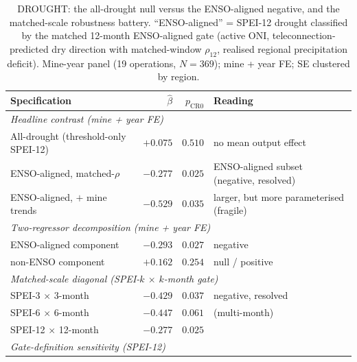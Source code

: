 \begin{table}[H]
\centering
\caption{DROUGHT: the all-drought null versus the ENSO-aligned negative, and the matched-scale robustness battery. ``ENSO-aligned'' = SPEI-12 drought classified by the matched 12-month ENSO-aligned gate (active ONI, teleconnection-predicted dry direction with matched-window $\rho_{12}$, realised regional precipitation deficit). Mine-year panel (19 operations, $N=369$); mine + year FE; SE clustered by region.}
\label{tab:drought-matched}
\small
\begin{tabular}{lrrl}
\toprule
\textbf{Specification} & $\hat\beta$ & $p_{\text{CR0}}$ & \textbf{Reading} \\
\midrule
\multicolumn{4}{l}{\emph{Headline contrast (mine + year FE)}} \\
\quad All-drought (threshold-only SPEI-12)      & $+0.075$ & $0.510$ & no mean output effect \\
\quad ENSO-aligned, matched-$\rho$              & $-0.277$ & $0.025$ & ENSO-aligned subset (negative, resolved) \\
\quad ENSO-aligned, $+$ mine trends             & $-0.529$ & $0.035$ & larger, but more parameterised (fragile) \\
\midrule
\multicolumn{4}{l}{\emph{Two-regressor decomposition (mine + year FE)}} \\
\quad ENSO-aligned component                    & $-0.293$ & $0.027$ & negative \\
\quad non-ENSO component                        & $+0.162$ & $0.254$ & null / positive \\
\midrule
\multicolumn{4}{l}{\emph{Matched-scale diagonal (SPEI-$k$ $\times$ $k$-month gate)}} \\
\quad SPEI-3 $\times$ 3-month                   & $-0.429$ & $0.037$ & negative, resolved \\
\quad SPEI-6 $\times$ 6-month                   & $-0.447$ & $0.061$ & (multi-month) \\
\quad SPEI-12 $\times$ 12-month                 & $-0.277$ & $0.025$ & \\
\midrule
\multicolumn{4}{l}{\emph{Gate-definition sensitivity (SPEI-12)}} \\

\end{tabular}
\end{table}
